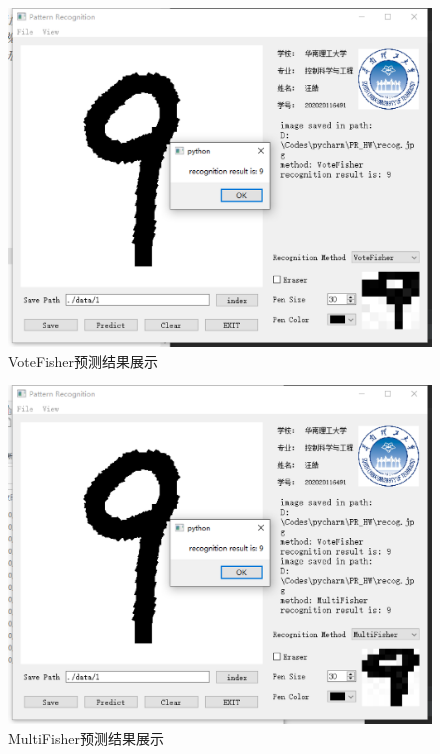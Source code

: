 \documentclass[UTF8, a4paper, 12pt]{report}
\begin{document}
		\begin{figure}[!h]
		\centering
		\includegraphics[scale=0.4]{./img/Predict1.eps}
		\caption{VoteFisher预测结果展示}
		\label{fig:5.1}
		\end{figure}
		\begin{figure}[!h]
		\centering
		\includegraphics[scale=0.4]{./img/Predict2.eps}
		\caption{MultiFisher预测结果展示}
		\label{fig:5.2}
		\end{figure}
\end{document}
